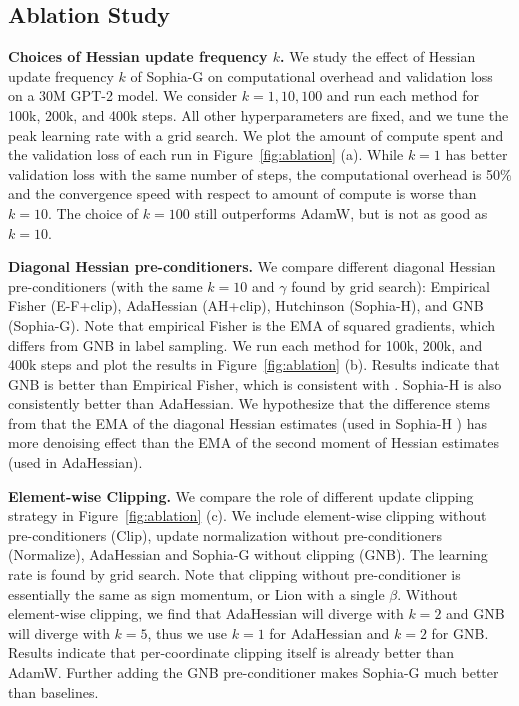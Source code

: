 \subsection{Ablation Study}\label{sec:ablation}

\textbf{Choices of Hessian update frequency $k$.} We study the effect of Hessian update frequency $k$ of Sophia-G on computational overhead and validation loss on a 30M GPT-2 model. We consider $k=1,10,100$ and run each method for 100k, 200k, and 400k steps. All other hyperparameters are fixed, and we tune the peak learning rate with a grid search. We plot the amount of compute spent and the validation loss of each run in Figure~\ref{fig:ablation} (a). While $k=1$ has better validation loss with the same number of steps, the computational overhead is 50$\%$ and the convergence speed with respect to amount of compute is worse than $k=10$. The choice of $k=100$ still outperforms AdamW, but is not as good as $k=10$.

\textbf{Diagonal Hessian pre-conditioners.} We compare different diagonal Hessian pre-conditioners (with the same $k=10$ and $\gamma$ found by grid search): Empirical Fisher (E-F+clip), AdaHessian (AH+clip), Hutchinson (Sophia-H), and GNB (Sophia-G). Note that empirical Fisher is the EMA of squared gradients, which differs from GNB in label sampling. We run each method for 100k, 200k, and 400k steps and plot the results in Figure~\ref{fig:ablation} (b). Results indicate that GNB is better than Empirical Fisher, which is consistent with \citet{kunstner2019limitations}. Sophia-H is also consistently better than AdaHessian. We hypothesize that the difference stems from that the EMA of the diagonal Hessian estimates (used in Sophia-H ) has more denoising effect than the EMA of the second moment of Hessian estimates (used in AdaHessian). 

\textbf{Element-wise Clipping.} We compare the role of different update clipping strategy in Figure~\ref{fig:ablation} (c). We include element-wise clipping without pre-conditioners (Clip), update normalization without pre-conditioners (Normalize), AdaHessian and Sophia-G without clipping (GNB). The learning rate is found by grid search. Note that clipping without pre-conditioner is essentially the same as sign momentum, or Lion with a single $\beta$. Without element-wise clipping, we find that AdaHessian will diverge with $k=2$ and GNB will diverge with $k=5$, thus we use $k=1$ for AdaHessian and $k=2$ for GNB. Results indicate that per-coordinate clipping itself is already better than AdamW. Further adding the GNB pre-conditioner makes Sophia-G much better than baselines.


